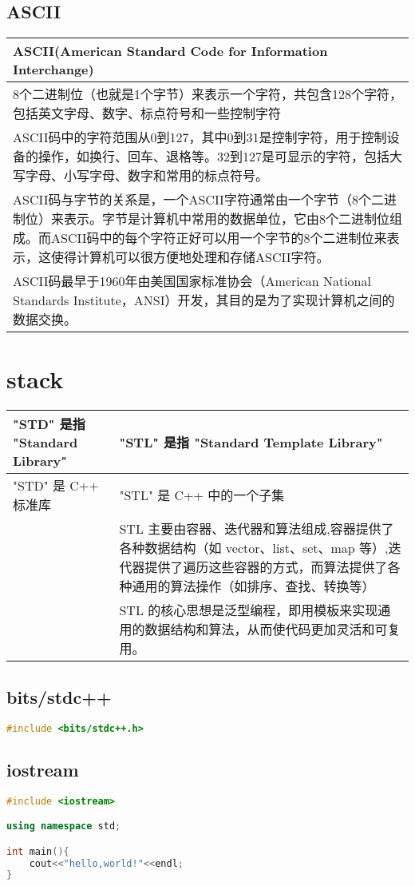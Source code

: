 \documentclass[12pt,twiside,a4paper]{ctexbook}
\numberwithin{chapter}{part}
\begin{document}
\section{ASCII}
\begin{tabular}{|p{18cm}|}
\hline
ASCII(American Standard Code for Information Interchange)\\
\hline
8个二进制位（也就是1个字节）来表示一个字符，共包含128个字符，包括英文字母、数字、标点符号和一些控制字符\\
\hline
ASCII码中的字符范围从0到127，其中0到31是控制字符，用于控制设备的操作，如换行、回车、退格等。32到127是可显示的字符，包括大写字母、小写字母、数字和常用的标点符号。\\
\hline
ASCII码与字节的关系是，一个ASCII字符通常由一个字节（8个二进制位）来表示。字节是计算机中常用的数据单位，它由8个二进制位组成。而ASCII码中的每个字符正好可以用一个字节的8个二进制位来表示，这使得计算机可以很方便地处理和存储ASCII字符。\\
\hline
ASCII码最早于1960年由美国国家标准协会（American National Standards Institute，ANSI）开发，其目的是为了实现计算机之间的数据交换。\\
\hline
\end{tabular}

\chapter{stack}
\begin{tabular}{|p{8cm}|p{8cm}|}
\hline
"STD" 是指 "Standard Library" &  "STL" 是指 "Standard Template Library"\\
\hline
"STD" 是 C++ 标准库&"STL" 是 C++ 中的一个子集\\
&STL 主要由容器、迭代器和算法组成,容器提供了各种数据结构（如 vector、list、set、map 等）,迭代器提供了遍历这些容器的方式，而算法提供了各种通用的算法操作（如排序、查找、转换等）\\
\hline
&STL 的核心思想是泛型编程，即用模板来实现通用的数据结构和算法，从而使代码更加灵活和可复用。\\
\hline
\end{tabular}
\section{bits/stdc++}
\begin{lstlisting}[language=C++]
#include <bits/stdc++.h>
\end{lstlisting}
\section{iostream}
\begin{lstlisting}[language=C++]
#include <iostream>

using namespace std;

int main(){
	cout<<"hello,world!"<<endl;
}
\end{lstlisting}
\end{document}
